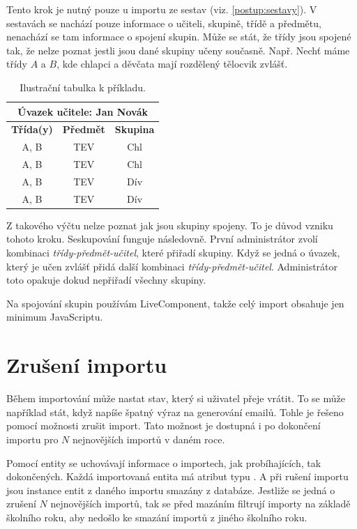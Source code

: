 Tento krok je nutný pouze u importu ze sestav (viz. \ref{postup:sestavy}).
V sestavách se nachází pouze informace o učiteli, skupině, třídě a předmětu, nenachází se tam informace o spojení skupin.
Může se stát, že třídy jsou spojené tak, že nelze poznat jestli jsou dané skupiny učeny současně.
Např. Nechť máme třídy $A$ a $B$, kde chlapci a děvčata mají rozdělený tělocvik zvlášť.

\begin{table}[h!]
\centering
\begin{tabular}{ | c | c | c | }
\hline
 \multicolumn{3}{|c|}{\textbf{Úvazek učitele:} Jan Novák}\\
     \hline
 \textbf{Třída(y)} & \textbf{Předmět} & \textbf{Skupina}\\
 \hline
 A, B & TEV & Chl \\ 
 \hline
 A, B & TEV & Chl \\  
 \hline
 A, B & TEV & Dív \\ 
 \hline
 A, B & TEV & Dív \\  
 \hline
\end{tabular}
\caption{Ilustrační tabulka k příkladu.}
\end{table}

Z takového výčtu nelze poznat jak jsou skupiny spojeny.
To je důvod vzniku tohoto kroku.
Seskupování funguje následovně.
První administrátor zvolí kombinaci \textit{třídy-předmět-učitel}, které přiřadí skupiny. 
Když se jedná o úvazek, který je učen zvlášť přidá další kombinaci \textit{třídy-předmět-učitel}. Administrátor toto opakuje dokud nepřiřadí všechny skupiny.

Na spojování skupin používám LiveComponent, takže celý import obsahuje jen minimum JavaScriptu.

\section{Zrušení importu}\label{postup:zruseni-importu}

Během importování může nastat stav, který si uživatel přeje vrátit.
To se může například stát, když napíše špatný výraz na generování emailů.
Tohle je řešeno pomocí možnosti zrušit import.
Tato možnost je dostupná i po dokončení importu pro $N$ nejnovějších importů v daném roce.

Pomocí entity  se uchovávají informace o importech, jak probíhajících, tak dokončených.
Každá importovaná entita má atribut  typu .
A při rušení importu jsou instance entit z daného importu smazány z databáze.
Jestliže se jedná o zrušení $N$ nejnovějších importů, tak se před mazáním filtrují importy na základě školního roku, aby nedošlo ke smazání importů z jiného školního roku.


